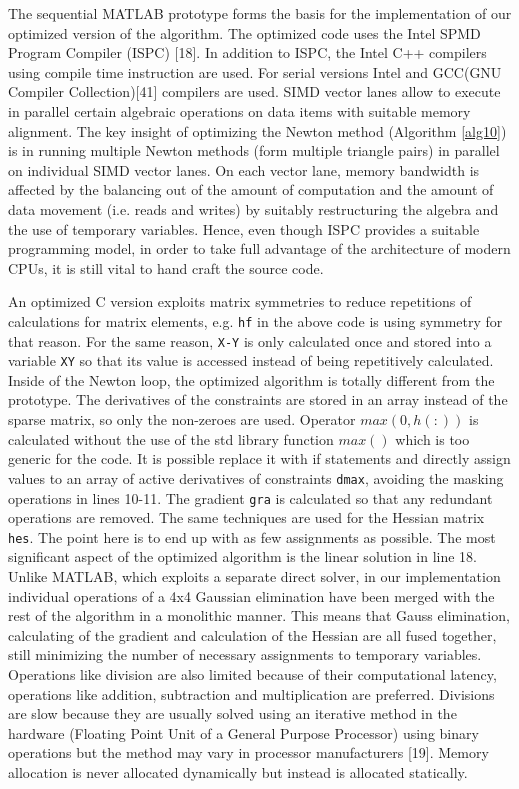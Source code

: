 \documentclass[times,12pt]{ACME2015article}
\begin{document}
\clearpage

The sequential MATLAB prototype forms the basis for the implementation of our optimized version of the algorithm. The optimized code uses the Intel SPMD Program Compiler (ISPC) [18]. In addition to ISPC, the Intel C++ compilers using compile time instruction are used. For serial versions Intel and GCC(GNU Compiler Collection)[41] compilers are used. SIMD vector lanes allow to execute in parallel certain algebraic operations on data items with suitable memory alignment. The key insight of optimizing the Newton method (Algorithm \ref{alg10}) is in running multiple Newton methods (form multiple triangle pairs) in parallel on individual SIMD vector lanes. On each vector lane, memory bandwidth is affected by the balancing out of the amount of computation and the amount of data movement (i.e. reads and writes) by suitably restructuring the algebra and the use of temporary variables. Hence, even though ISPC provides a suitable programming model, in order to take full advantage of the architecture of modern CPUs, it is still vital to hand craft the source code.

An optimized C version exploits matrix symmetries to reduce repetitions of calculations for matrix elements, e.g. \texttt{hf} in the above code is using symmetry for that reason. For the same reason, \texttt{X-Y} is only calculated once and stored into a variable \texttt{XY} so that its value is accessed instead of being repetitively calculated. Inside of the Newton loop, the optimized algorithm is totally different from the prototype. The derivatives of the constraints are stored in an array instead of the sparse matrix, so only the non-zeroes are used. Operator $max(0,h(:))$ is calculated without the use of the std library function $max()$ which is too generic for the code. It is possible replace it with if statements and directly assign values to an array of active derivatives of constraints \texttt{dmax}, avoiding the masking operations in lines 10-11. The gradient \texttt{gra} is calculated so that any redundant operations are removed. The same techniques are used for the Hessian matrix \texttt{hes}. The point here is to end up with as few assignments as possible. The most significant aspect of the optimized algorithm is the linear solution in line 18. Unlike MATLAB, which exploits a separate direct solver, in our implementation individual operations of a 4x4 Gaussian elimination have been merged with the rest of the algorithm in a monolithic manner. This means that Gauss elimination, calculating of the gradient and calculation of the Hessian are all fused together, still minimizing the number of necessary assignments to temporary variables.  Operations like division are also limited because of their computational latency, operations like addition, subtraction and multiplication are preferred. Divisions are slow because they are usually solved using an iterative method in the hardware (Floating Point Unit of a General Purpose Processor) using binary operations but the method may vary in processor manufacturers [19].  Memory allocation is never allocated dynamically but instead is allocated statically.
\end{document}
